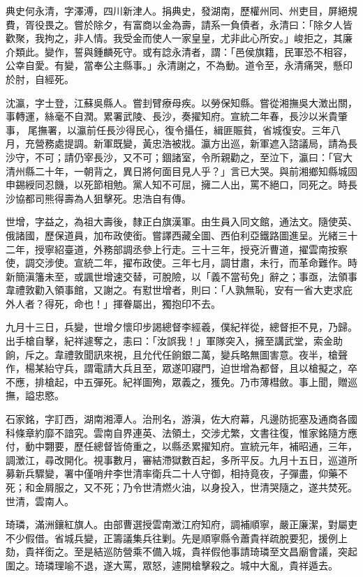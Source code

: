 \begin{pinyinscope}
典史何永清，字澤溥，四川新津人。捐典史，發湖南，歷權州同、州吏目，屏絕規費，胥役畏之。嘗於除夕，有富商以金為壽，請系一負債者，永清曰：「除夕人皆歡聚，我拘之，非人情。我受金而使人一家皇皇，尤非此心所安。」峻拒之，其廉介類此。變作，誓與鍾麟死守。或有諗永清者，謂：「邑侯旗籍，民軍恐不相容，公幸自愛。有變，當奉公主縣事。」永清謝之，不為動。道令至，永清痛哭，懸印於肘，自經死。

沈瀛，字士登，江蘇吳縣人。嘗刲臂療母疾。以勞保知縣。嘗從湘撫吳大澂出關，事轉運，絲毫不自潤。累署武陵、長沙，奏擢知府。宣統二年春，長沙以米貴肇事，尾撫署，以瀛前任長沙得民心，復令攝任，緝匪賑貧，省城復安。三年八月，充營務處提調。新軍既變，黃忠浩被戕。瀛方出巡，新軍遮入諮議局，請為長沙守，不可；請仍宰長沙，又不可；錮諸室，令所親勸之，至泣下，瀛曰：「官大清州縣二十年，一朝背之，異日將何面目見人乎？」言已大哭。與前湘鄉知縣城固申錫綬同忍饑，以死節相勉。黨人知不可屈，擁二人出，罵不絕口，同死之。時長沙協都司熊得壽為人狙擊死。忠浩自有傳。

世增，字益之，為祖大壽後，隸正白旗漢軍。由生員入同文館，通法文。隨使英、俄諸國，歷保道員，加布政使銜。嘗譯西藏全圖、西伯利亞鐵路圖進呈。光緒三十二年，授寧紹臺道，外務部調丞參上行走。三十三年，授兗沂曹道，擢雲南按察使，調交涉使。宣統二年，擢布政使。三年七月，調甘肅，未行，而革命難作。時新簡滇籓未至，或諷世增速交替，可脫險，以「義不當茍免」辭之；事亟，法領事韋禮敦勸入領事館，又謝之。有懟世增者，則曰：「人孰無恥，安有一省大吏求庇外人者？得死，命也！」揮眷屬出，獨抱印不去。

九月十三日，兵變，世增夕懷印步謁總督李經羲，僕紀祥從，總督拒不見，乃歸。出手槍自擊，紀祥遽奪之，恚曰：「汝誤我！」軍隊突入，擁至講武堂，索金助餉，斥之。韋禮敦聞訊來視，且允代任餉銀二萬，變兵略無圖害意。夜半，槍聲作，楊某紿守兵，謂電請大兵且至，眾遂叩寢門，迫世增為都督，且以槍擬之，卒不應，排槍起，中五彈死。紀祥圖殉，眾義之，獲免。乃市薄槥斂。事上聞，贈巡撫，謚忠愍。

石家銘，字訂西，湖南湘潭人。治刑名，游滇，佐大府幕，凡邊防扼塞及通商各國科條章約靡不諳究。雲南自界連英、法領土，交涉尤繁，文書往復，惟家銘隨方應付，動中翾要，歷任總督皆倚重之，以縣丞累擢知府。宣統元年，補昭通，三年，調澂江，尋改開化。視事數月，審結滯獄數百起，多所平反。九月十五日，巡道所募新兵驟變，署中僅哨弁李世清率衛兵二十人守御，相持竟夜，子彈盡，仰藥不死；和金屑服之，又不死；乃令世清燃火油，以身投入，世清哭隨之，遂共焚死。世清，雲南人。

琦璘，滿洲鑲紅旗人。由部曹選授雲南澂江府知府，調補順寧，嚴正廉潔，對屬吏不少假借。省城兵變，正籌議集兵往剿。先是順寧縣令蕭貴祥疏脫要犯，援例上劾，貴祥銜之。至是結巡防營乘不備入城，貴祥假他事請琦璘至文昌廟會議，突起圍之。琦璘理喻不退，遂大罵，眾怒，遽開槍擊殺之。城中大亂，貴祥遁去。


\end{pinyinscope}
